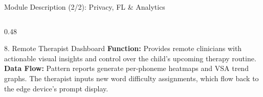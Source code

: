 \documentclass[aspectratio=169, 11pt, xcolor=table]{beamer}
\begin{document}
\begin{frame}{Module Description (2/2): Privacy, FL \& Analytics}
\begin{columns}[T, totalwidth=\textwidth]
\begin{column}{0.48\textwidth}
            \vspace{1mm}
            \begin{block}{8. Remote Therapist Dashboard}
                \tiny
                \textbf{Function:} Provides remote clinicians with actionable visual insights and control over the child's upcoming therapy routine. \\
                \textbf{Data Flow:} Pattern reports generate per-phoneme heatmaps and VSA trend graphs. The therapist inputs new word difficulty assignments, which flow back to the edge device's prompt display.
            \end{block}
        \end{column}

    \end{columns}
\end{frame}
\end{document}
